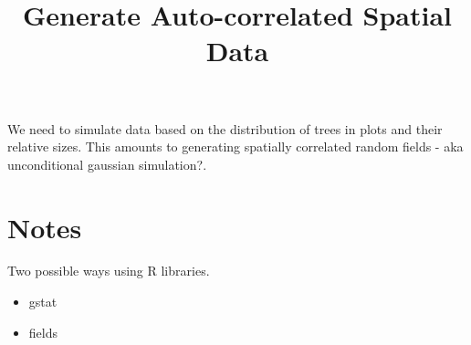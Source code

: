 \documentclass{article}
\title{Generate Auto-correlated Spatial Data}
\begin{document}
\maketitle

We need to simulate data based on the distribution of trees in plots and their relative sizes.
This amounts to generating spatially correlated random fields - aka unconditional gaussian simulation?.  
\section{Notes}
Two possible ways using R libraries.
\begin{itemize}
\item gstat
\item fields


\end{itemize}

  
\end{document}
